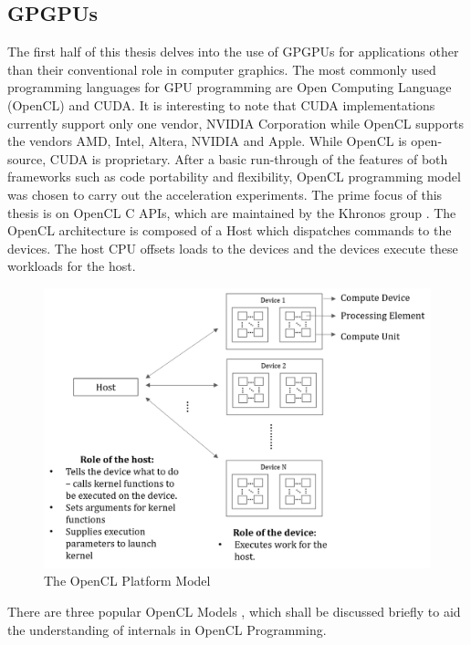 \subsection{GPGPUs}
\label{2_3_1}
The first half of this thesis delves into the use of GPGPUs for applications other than their conventional role in computer graphics. The most commonly used programming languages for GPU programming are Open Computing Language (OpenCL) and CUDA. It is interesting to note that CUDA implementations currently support only one vendor, NVIDIA Corporation while OpenCL supports the vendors AMD, Intel, Altera, NVIDIA and Apple.\newline \newline
While OpenCL is open-source, CUDA is proprietary. After a basic run-through of the features of both frameworks such as code portability and flexibility, OpenCL programming model was chosen to carry out the acceleration experiments. The prime focus of this thesis is on OpenCL C APIs, which are maintained by the Khronos group \cite{khronos2008opencl}. The OpenCL architecture is composed of a Host which dispatches commands to the devices. The host CPU offsets loads to the devices and the devices execute these workloads for the host.

\begin{figure}[h!]
  \includegraphics[width=\linewidth]{figures/openCL_architcture.png}
  \caption{The OpenCL Platform Model
  \cite{rosenberg2011opencl}}
  \label{fig:openCL_architecture}
\end{figure}

There are three popular OpenCL Models \cite{opencl_ajg}, which shall be discussed briefly to aid the understanding of internals in OpenCL Programming. 
